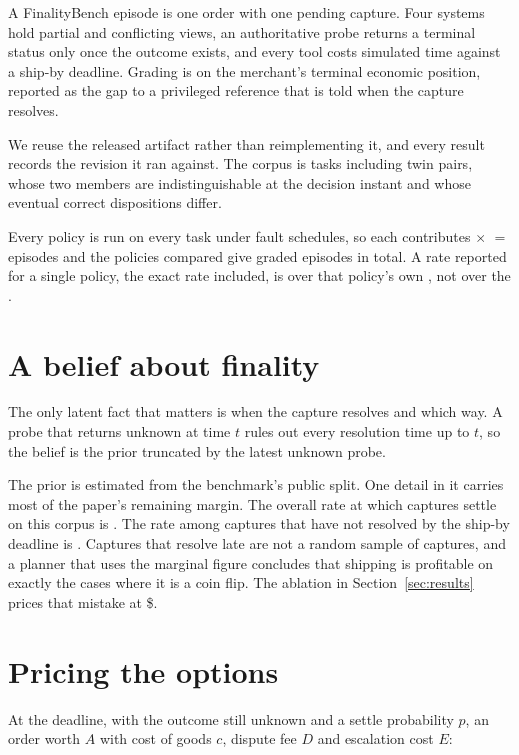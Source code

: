 \documentclass[conference]{IEEEtran}
\begin{document}
A FinalityBench episode is one order with one pending capture. Four systems hold
partial and conflicting views, an authoritative probe returns a terminal status
only once the outcome exists, and every tool costs simulated time against a
ship-by deadline. Grading is on the merchant's terminal economic position,
reported as the gap to a privileged reference that is told when the capture
resolves.

We reuse the released artifact rather than reimplementing it, and every result
records the revision it ran against. The corpus is \nTasks{} tasks including
\nPairs{} twin pairs, whose two members are indistinguishable at the decision
instant and whose eventual correct dispositions differ.

Every policy is run on every task under \nSeeds{} fault schedules, so each
contributes \nTasks{} $\times$ \nSeeds{} $=$ \nRuleEpisodes{} episodes and the
\nPolicies{} policies compared give \nGrades{} graded episodes in total. A rate
reported for a single policy, the exact rate included, is over that policy's own
\nRuleEpisodes{}, not over the \nGrades{}.

\section{A belief about finality}
\label{sec:belief}

The only latent fact that matters is when the capture resolves and which way.
A probe that returns unknown at time $t$ rules out every resolution time up to
$t$, so the belief is the prior truncated by the latest unknown probe.

The prior is estimated from the benchmark's public split. One detail in it
carries most of the paper's remaining margin. The overall rate at which captures
settle on this corpus is \settleMarginal. The rate among captures that have not
resolved by the ship-by deadline is \settleLate. Captures that resolve late are
not a random sample of captures, and a planner that uses the marginal figure
concludes that shipping is profitable on exactly the cases where it is a coin
flip. The ablation in Section~\ref{sec:results} prices that mistake at
\$\ablPrior.

\section{Pricing the options}
\label{sec:planner}

At the deadline, with the outcome still unknown and a settle probability $p$,
an order worth $A$ with cost of goods $c$, dispute fee $D$ and escalation cost
$E$:
\end{document}
